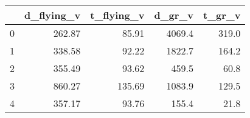 \begin{tabular}{lrrrr}
\toprule
{} &  d\_flying\_v &  t\_flying\_v &  d\_gr\_v &  t\_gr\_v \\
\midrule
0 &      262.87 &       85.91 &  4069.4 &   319.0 \\
1 &      338.58 &       92.22 &  1822.7 &   164.2 \\
2 &      355.49 &       93.62 &   459.5 &    60.8 \\
3 &      860.27 &      135.69 &  1083.9 &   129.5 \\
4 &      357.17 &       93.76 &   155.4 &    21.8 \\
\bottomrule
\end{tabular}
